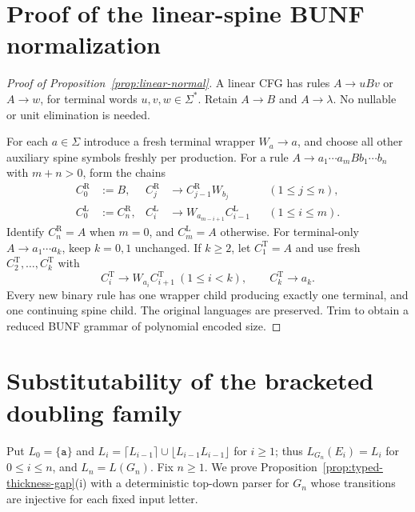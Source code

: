 \documentclass[11pt,a4paper]{article}
\theoremstyle{remark}
\theoremstyle{plain}
\begin{document}
\section{Proof of the linear-spine BUNF normalization}
\label{app:linear-normalization}
\begin{proof}[Proof of Proposition~\ref{prop:linear-normal}]
A linear CFG has rules $A\to uBv$
or $A\to w$, for terminal words
$u,v,w\in\Sigma^*$.
Retain $A\to B$ and $A\to\lambda$.
No nullable or unit elimination is needed.

For each $a\in\Sigma$ introduce a fresh
terminal wrapper $W_a\to a$, and choose
all other auxiliary spine symbols freshly
per production. For a rule
$A\to a_1\cdots a_m B b_1\cdots b_n$
with $m+n>0$, form the chains
\[
\begin{aligned}
C^{\mathrm R}_0&:=B,&
C^{\mathrm R}_j&\to C^{\mathrm R}_{j-1}W_{b_j}
  &&(1\le j\le n),\\
C^{\mathrm L}_0&:=C^{\mathrm R}_n,&
C^{\mathrm L}_i&\to W_{a_{m-i+1}}C^{\mathrm L}_{i-1}
  &&(1\le i\le m).
\end{aligned}
\]
Identify $C^{\mathrm R}_n=A$ when $m=0$,
and $C^{\mathrm L}_m=A$ otherwise.
For terminal-only $A\to a_1\cdots a_k$,
keep $k=0,1$ unchanged. If $k\ge2$,
let $C^{\mathrm T}_1=A$ and use fresh
$C^{\mathrm T}_2,\ldots,C^{\mathrm T}_k$ with
\[
C^{\mathrm T}_i\to W_{a_i}C^{\mathrm T}_{i+1}
\ (1\le i<k),\qquad C^{\mathrm T}_k\to a_k.
\]
Every new binary rule has one wrapper
child producing exactly one terminal,
and one continuing spine child.
The original languages are preserved.
Trim to obtain a reduced BUNF grammar
of polynomial encoded size.
\end{proof}

\section{Substitutability of the bracketed doubling family}
\label{app:bracketed-substitutability}

Put $L_0=\{\mathtt a\}$ and
$L_i=\lceil{}L_{i-1}\rceil\cup\lfloor{}L_{i-1}L_{i-1}\rfloor$ for $i\ge1$;
thus $L_{G_n}(E_i)=L_i$ for $0\le i\le n$, and $L_n=L(G_n)$.
Fix $n\ge1$. We prove
Proposition~\ref{prop:typed-thickness-gap}(i) with a deterministic
top-down parser for $G_n$ whose transitions are injective for
each fixed input letter.
\end{document}
